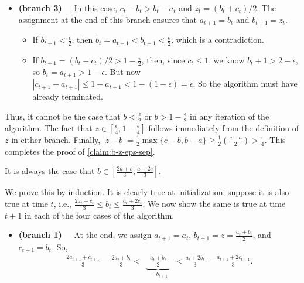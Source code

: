 \begin{lproof}
\begin{itemize}
     \item \textbf{(branch 3)~~} In this case, $c_t-b_t > b_t - a_t$ and $z_t = ({b_t+c_t})/2$.
     The assignment at the end of this branch ensures that
        $a_{t+1}=b_t$ and $b_{t+1}=z_t$.
    \begin{itemize}
    \item
     If $b_{t+1} < \frac\epsilon2$, then
         $b_t = a_{t+1} < b_{t+1} < \frac\epsilon2$.
         which is a contradiction.
    \item
        If $b_{t+1} = ({b_t+c_t})/2 > 1-\frac\epsilon2$, then,
        since $c_t \le 1$, we know $b_t + 1 > 2 - \epsilon$, so $b_t = a_{t+1} > 1-\epsilon$.
        But now $|c_{t+1} - a_{t+1}| \le 1 - a_{t+1} < 1- (1-\epsilon) = \epsilon$.
        So the algorithm must have already terminated.
    \end{itemize}
    \end{itemize}
    Thus, it cannot be the case that $b < \frac\epsilon2$ or $b > 1-\frac\epsilon2$ in any iteration of the algorithm. The fact that $z \in [\frac\epsilon4,1-\frac\epsilon4]$ follows immediately from the definition of $z$ in either branch.
    Finally, $|z-b| = \frac12 \max\{c-b, b-a\} \ge \frac12(\frac{c-a}{2}) > \frac\epsilon4$.
    This completes the proof of \cref{claim:b-z-eps-sep}. \qedsymbol


    \begin{iclaim}\label{claim:b-middlethird}
        It is always the case that $b \in [ \frac{2a + c}{3}, \frac{a + 2c}{3}]$.
    \end{iclaim}
    We prove this by induction. It is clearly true at initialization;
    suppose it is also true at time $t$, i.e., $\frac{2 a_t + c_t}{3} \le b_t \le \frac{a_t + 2 c_t}{3}$.
    We now show the same is true at time $t+1$ in each of the four cases of the algorithm.
    \begin{itemize}
        \item \textbf{(branch 1)~~}
            At the end, we assign
                $a_{t+1} = a_t$,
                $b_{t+1} = z = \frac{a_t + b_t}{2}$, and
                $c_{t+1} = b_t$.
            So,
            \begin{align*}
                \frac{2 a_{t+1} + c_{t+1}}{3}
                = \frac{2 a_t + b_t}{3} <
                ~~\underbrace{~~\frac{a_t+b_t}{2}~~}_{\textstyle = b_{t+1}}~~
                < \frac{a_t + 2 b_{t}}{3} =
                \frac{a_{t+1} + 2 c_{t+1}}{3}.
            \end{align*}


\end{itemize}
\end{lproof}
